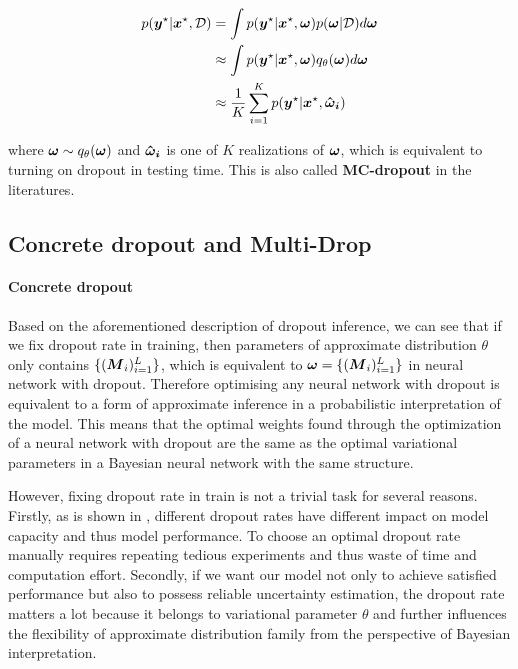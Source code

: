 \begin{equation}
\begin{aligned} \label{marginalization_test}
p(\boldsymbol y^{\star}| \boldsymbol x^{\star},\mathcal D) &= \int p(\boldsymbol y^{\star} | \boldsymbol x^{\star}, \boldsymbol \omega) p(\boldsymbol \omega |\mathcal D)d\boldsymbol \omega \\
&\approx \int p(\boldsymbol y^{\star} | \boldsymbol x^{\star}, \boldsymbol \omega) q_{\theta}(\boldsymbol \omega)d\boldsymbol \omega \\
&\approx \frac{1}{K}\sum_{i=1}^{K} p(\boldsymbol y^{\star} | \boldsymbol x^{\star}, \boldsymbol{\hat \omega_{i}}) 
\end{aligned}
\end{equation}

where $\boldsymbol \omega \sim q_{\theta}(\boldsymbol \omega)$ and $\boldsymbol{\hat \omega_{i}}$ is one of $K$ realizations of $\boldsymbol \omega$, which is equivalent to turning on dropout in testing time. This is also called \textbf{MC-dropout} in the literatures.

\subsection{Concrete dropout and Multi-Drop}
\paragraph{Concrete dropout} 
Based on the aforementioned description of dropout inference, we can see that if we fix dropout rate in training, then parameters of approximate distribution $\theta$ only contains $\{(\boldsymbol M_{i})^L_{i=1}\}$, which is equivalent to $\boldsymbol \omega = \{(\boldsymbol M_{i})^L_{i=1}\}$ in neural network with dropout. Therefore optimising any neural network with dropout is equivalent to a form of approximate inference in a probabilistic interpretation of the model. This means that the optimal weights found through the optimization of a neural network with dropout are the same as the optimal variational parameters in a Bayesian neural network with the same structure. 

However, fixing dropout rate in train is not a trivial task for several reasons. Firstly, as is shown in \cite{srivastava2014dropout}, different dropout rates have different impact on model capacity and thus model performance. To choose an optimal dropout rate manually requires repeating tedious experiments and thus waste of time and computation effort. Secondly, if we want our model not only to achieve satisfied performance but also to possess reliable uncertainty estimation, the dropout rate matters a lot because it belongs to variational parameter $\theta$ and further influences the flexibility of approximate distribution family from the perspective of Bayesian interpretation.


